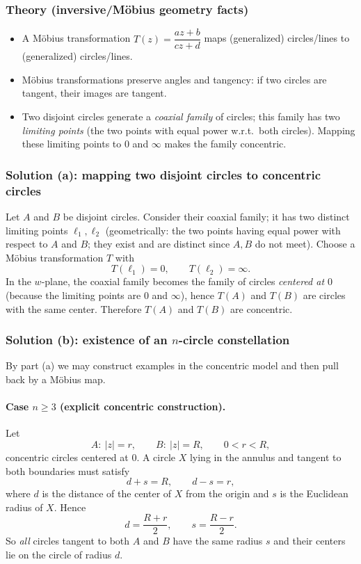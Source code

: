 \documentclass[12pt,a4paper]{article}
\theoremstyle{plain}
\theoremstyle{definition}      %
\begin{document}
\subsubsection*{Theory (inversive/M\"obius geometry facts)}
\begin{itemize}
	\item A M\"obius transformation $T(z)=\dfrac{az+b}{cz+d}$ maps (generalized) circles/lines to (generalized) circles/lines.
	\item M\"obius transformations preserve angles and tangency: if two circles are tangent, their images are tangent.
	\item Two disjoint circles generate a \emph{coaxial family} of circles; this family has two \emph{limiting points}
	(the two points with equal power w.r.t.\ both circles). Mapping these limiting points to $0$ and $\infty$ makes the family
	concentric.
\end{itemize}

\subsubsection*{Solution (a): mapping two disjoint circles to concentric circles}
Let $A$ and $B$ be disjoint circles. Consider their coaxial family; it has two distinct limiting points $\ell_1,\ell_2$
(geometrically: the two points having equal power with respect to $A$ and $B$; they exist and are distinct since $A,B$
do not meet).
Choose a M\"obius transformation $T$ with
\[
T(\ell_1)=0,\qquad T(\ell_2)=\infty.
\]
In the $w$-plane, the coaxial family becomes the family of circles \emph{centered at $0$} (because the limiting points are
$0$ and $\infty$), hence $T(A)$ and $T(B)$ are circles with the same center. Therefore $T(A)$ and $T(B)$ are concentric.

\subsubsection*{Solution (b): existence of an $n$-circle constellation}
By part (a) we may construct examples in the concentric model and then pull back by a M\"obius map.

\paragraph{Case $n\ge 3$ (explicit concentric construction).}
Let
\[
A:\ |z|=r,\qquad B:\ |z|=R,\qquad 0<r<R,
\]
concentric circles centered at $0$. A circle $X$ lying in the annulus and tangent to both boundaries must satisfy
\[
d+s=R,\qquad d-s=r,
\]
where $d$ is the distance of the center of $X$ from the origin and $s$ is the Euclidean radius of $X$.
Hence
\[
d=\frac{R+r}{2},\qquad s=\frac{R-r}{2}.
\]
So \emph{all} circles tangent to both $A$ and $B$ have the same radius $s$ and their centers lie on the circle of radius $d$.
\end{document}
